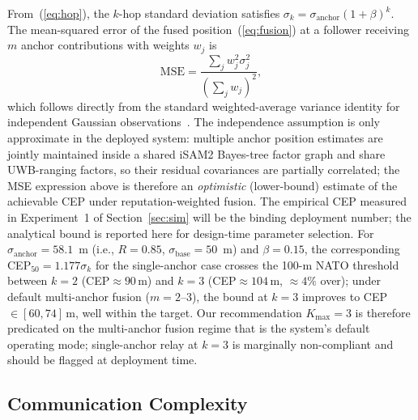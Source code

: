 \documentclass[conference,10pt]{IEEEtran}
\begin{document}
From~(\ref{eq:hop}), the $k$-hop standard deviation satisfies $\sigma_k = \sigma_\text{anchor}(1+\beta)^k$. The mean-squared error of the fused position~(\ref{eq:fusion}) at a follower receiving $m$ anchor contributions with weights $w_j$ is
\begin{equation}
\mathrm{MSE} = \frac{\sum_j w_j^2 \sigma_j^2}{\left(\sum_j w_j\right)^2},
\end{equation}
which follows directly from the standard weighted-average variance identity for independent Gaussian observations~\cite{kay1993estimation}. The independence assumption is only approximate in the deployed system: multiple anchor position estimates are jointly maintained inside a shared iSAM2 Bayes-tree factor graph and share UWB-ranging factors, so their residual covariances are partially correlated; the MSE expression above is therefore an \emph{optimistic} (lower-bound) estimate of the achievable CEP under reputation-weighted fusion. The empirical CEP measured in Experiment~1 of Section~\ref{sec:sim} will be the binding deployment number; the analytical bound is reported here for design-time parameter selection.
For $\sigma_\text{anchor}=58.1$~m (i.e., $R=0.85$, $\sigma_\text{base}=50$~m) and $\beta=0.15$, the corresponding CEP$_{50}=1.177\sigma_k$ for the single-anchor case crosses the 100-m NATO threshold between $k=2$ (CEP$\approx 90$\,m) and $k=3$ (CEP$\approx 104$\,m, $\approx 4\%$ over); under default multi-anchor fusion ($m{=}2$--$3$), the bound at $k=3$ improves to CEP$\in[60,74]$\,m, well within the target. Our recommendation $K_\text{max}{=}3$ is therefore predicated on the multi-anchor fusion regime that is the system's default operating mode; single-anchor relay at $k=3$ is marginally non-compliant and should be flagged at deployment time.

\subsection{Communication Complexity}
\end{document}
